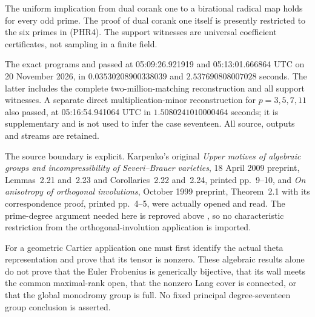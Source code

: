\begin{remark}
\label{rem:prime-Heisenberg-rank-scope}
The uniform implication from dual corank one to a birational
radical map holds for every odd prime. The proof of dual corank
one itself is presently restricted to the six primes in (PHR4).
The support witnesses are universal coefficient certificates,
not sampling in a finite field.

The exact programs
and
passed at 05:09:26.921919 and 05:13:01.666864 UTC on
20 November 2026, in \(0.03530208900338039\) and
\(2.537690808007028\) seconds. The latter includes the complete
two-million-matching reconstruction and all support witnesses.
A separate direct multiplication-minor reconstruction for
\(p=3,5,7,11\) also passed, at 05:16:54.941064 UTC in
\(1.5080241010000464\) seconds; it is supplementary and is not
used to infer the case seventeen.
All source, outputs and streams are retained.

The source boundary is explicit. Karpenko's original
\emph{Upper motives of algebraic groups and incompressibility of
Severi--Brauer varieties}, 18 April 2009 preprint,
Lemmas~2.21 and~2.23 and Corollaries~2.22 and~2.24, printed pp.~9--10, and
\emph{On anisotropy of orthogonal involutions}, October 1999 preprint,
Theorem~2.1
with its correspondence proof, printed pp.~4--5, were actually
opened and read. The prime-degree argument needed here is
reproved above \citep{Karpenko2009UpperMotives,Karpenko1999Anisotropy}, so no
characteristic restriction from the
orthogonal-involution application is imported.

For a geometric Cartier application one must first identify the
actual theta representation and prove that its tensor is nonzero.
These algebraic results alone do not prove that the Euler
Frobenius is generically bijective, that its wall meets the common
maximal-rank open, that the nonzero Lang cover is connected, or
that the global monodromy group is full. No fixed principal
degree-seventeen group conclusion is asserted.
\end{remark}

